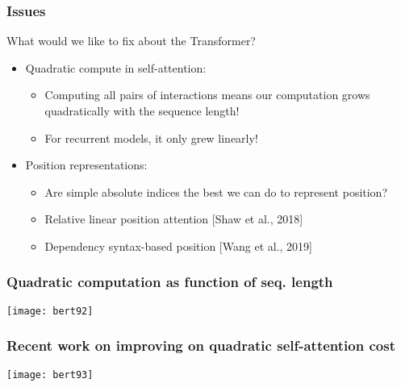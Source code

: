 \begin{frame}[fragile]\frametitle{Issues}

What would we like to fix about the Transformer?

      \begin{itemize}
			\item Quadratic compute in self-attention:
			      \begin{itemize}
						\item Computing all pairs of interactions means our computation grows quadratically with the sequence length!
						\item For recurrent models, it only grew linearly!
						\end{itemize}
			\item Position representations:
			      \begin{itemize}
						\item Are simple absolute indices the best we can do to represent position?
						\item Relative linear position attention [Shaw et al., 2018]
						\item Dependency syntax-based position [Wang et al., 2019]			
						\end{itemize}
			\end{itemize}


\end{frame}

\begin{frame}[fragile]\frametitle{Quadratic computation as function of seq. length}

			
			\begin{center}
			\texttt{[image: bert92]}
			\end{center}		
			

\end{frame}

\begin{frame}[fragile]\frametitle{Recent work on improving on quadratic self-attention cost}

			
			\begin{center}
			\texttt{[image: bert93]}
			\end{center}		
			

\end{frame}

